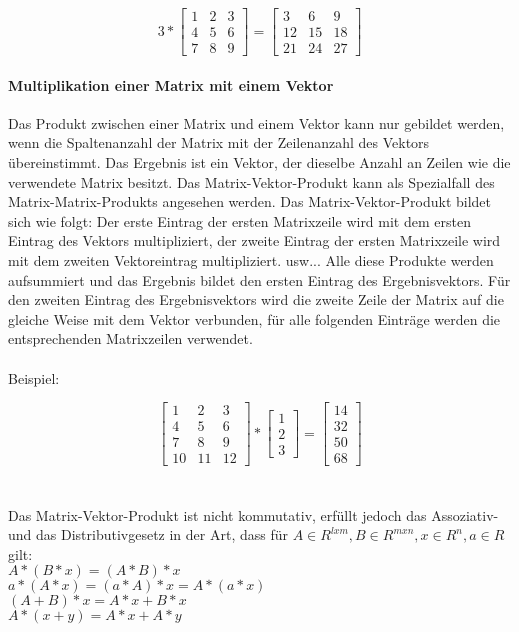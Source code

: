 \documentclass[11pt]{scrreprt}
\begin{document}
\begin{equation}
3*
\begin{bmatrix}
1 & 2 & 3 \\
4 & 5 & 6 \\
7 & 8 & 9
\end {bmatrix}
=
\begin{bmatrix}
3 & 6 & 9 \\
12 & 15 & 18 \\
21 & 24 & 27
\end {bmatrix}
\end{equation}

\paragraph{Multiplikation einer Matrix mit einem Vektor}
Das Produkt zwischen einer Matrix und einem Vektor kann nur gebildet werden, wenn die Spaltenanzahl der Matrix mit der Zeilenanzahl des Vektors übereinstimmt. Das Ergebnis ist ein Vektor, der dieselbe Anzahl an Zeilen wie die verwendete Matrix besitzt. Das Matrix-Vektor-Produkt kann als Spezialfall des Matrix-Matrix-Produkts angesehen werden. Das Matrix-Vektor-Produkt bildet sich wie folgt: Der erste Eintrag der ersten Matrixzeile wird mit dem ersten Eintrag des Vektors multipliziert, der zweite Eintrag der ersten Matrixzeile wird mit dem zweiten Vektoreintrag multipliziert. usw... Alle diese Produkte werden aufsummiert und das Ergebnis bildet den ersten Eintrag des Ergebnisvektors. Für den zweiten Eintrag des Ergebnisvektors wird die zweite Zeile der Matrix auf die gleiche Weise mit dem Vektor verbunden, für alle folgenden Einträge werden die entsprechenden Matrixzeilen verwendet.\\
\\
Beispiel:

\begin{equation}
\begin{bmatrix}
1 & 2 & 3 \\
4 & 5 & 6 \\
7 & 8 & 9 \\
10 & 11 & 12
\end {bmatrix}
*
\begin{bmatrix}
1 \\
2 \\
3
\end {bmatrix}
=
\begin{bmatrix}
14  \\
32  \\
50 \\
68
\end {bmatrix}
\end{equation}
\\
\\
Das Matrix-Vektor-Produkt ist nicht kommutativ, erfüllt jedoch das Assoziativ- und das Distributivgesetz in der Art, dass für $A \in R^{l x m}, B \in R^{m x n}, x \in R^n, a \in R$ gilt:\\
$A*(B*x) = (A*B)*x$\\
$a*(A*x) = (a*A)*x = A*(a*x)$\\
$(A+B)*x = A*x + B*x$\\
$A*(x+y) = A*x + A*y$
\end{document}
